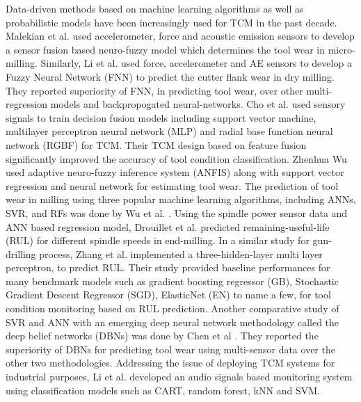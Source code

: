 \documentclass[preprint,review,12pt]{elsarticle}
\begin{document}
Data-driven methods based on machine learning algorithms as well as probabilistic models have been increasingly used for TCM in the past decade. Malekian et al. \cite{CITE2} used accelerometer, force and acoustic emission sensors to develop a sensor fusion based neuro-fuzzy model which determines the tool wear in micro-milling. Similarly, Li et al. \cite{CITE3} used force, accelerometer and AE sensors to develop a Fuzzy Neural Network (FNN) to predict the cutter flank wear in dry milling. They reported superiority of FNN, in predicting tool wear, over other multi-regression models and backpropogated neural-networks. Cho et al. \cite{CITE4} used sensory signals to train decision fusion models including support vector machine, multilayer perceptron neural network (MLP) and radial base function neural network (RGBF) for TCM. Their TCM design based on feature fusion significantly improved the accuracy of tool condition classification. Zhenhua Wu \cite{CITE5} used adaptive neuro-fuzzy inference system (ANFIS) along with support vector regression and neural network for estimating tool wear. The prediction of tool wear in milling using three popular machine learning algorithms, including ANNs, SVR, and RFs was done by Wu et al. \cite{CITE6}. Using the spindle power sensor data and ANN based regression model, Drouillet et al. \cite{CITE7} predicted remaining-useful-life (RUL) for different spindle speeds in end-milling. In a similar study for gun-drilling process, Zhang et al. \cite{CITE8} implemented a three-hidden-layer multi layer perceptron, to predict RUL. Their study provided baseline performances for many benchmark models such as gradient boosting regressor (GB), Stochastic Gradient Descent Regressor (SGD), ElasticNet (EN) to name a few, for tool condition monitoring based on RUL prediction. Another comparative study of SVR and ANN with an emerging deep neural network methodology called the deep belief networks (DBNs) was done by Chen et al \cite{CITE9}. They reported the superiority of DBNs for predicting tool wear using multi-sensor data over the other two methodologies. Addressing the issue of deploying TCM systems for industrial purposes, Li et al. \cite{CITE10} developed an audio signals based monitoring system using classification models such as CART, random forest, kNN and SVM. \par
\end{document}
